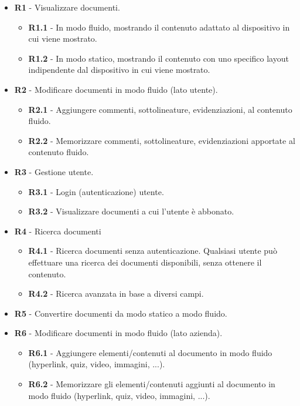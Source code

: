 \begin{itemize}
    \item \textbf{R1} - Visualizzare documenti.
    \begin{itemize}
        \item \textbf{R1.1} - In modo fluido, mostrando il contenuto adattato al dispositivo in cui viene mostrato.
        \item \textbf{R1.2} - In modo statico, mostrando il contenuto con uno specifico layout indipendente dal dispositivo in cui viene mostrato.
    \end{itemize}
    \item \textbf{R2} - Modificare documenti in modo fluido (lato utente).
    \begin{itemize}
        \item \textbf{R2.1} - Aggiungere commenti, sottolineature, evidenziazioni, al contenuto fluido.
        \item \textbf{R2.2} - Memorizzare commenti, sottolineature, evidenziazioni apportate al contenuto fluido.
    \end{itemize}
    \item \textbf{R3} - Gestione utente.
    \begin{itemize}
        \item \textbf{R3.1} - Login (autenticazione) utente.
        \item \textbf{R3.2} - Visualizzare documenti a cui l'utente è abbonato.
    \end{itemize}
    \item \textbf{R4} - Ricerca documenti
    \begin{itemize}
        \item \textbf{R4.1} - Ricerca documenti senza autenticazione. Qualsiasi utente può effettuare una ricerca dei documenti disponibili, senza ottenere il contenuto.
        \item \textbf{R4.2} - Ricerca avanzata in base a diversi campi.
    \end{itemize}
    \item \textbf{R5} - Convertire documenti da modo statico a modo fluido.
    \item \textbf{R6} - Modificare documenti in modo fluido (lato azienda).
    \begin{itemize}
        \item \textbf{R6.1} - Aggiungere elementi/contenuti al documento in modo fluido (hyperlink, quiz, video, immagini, ...).
        \item \textbf{R6.2} - Memorizzare gli elementi/contenuti aggiunti al documento in modo fluido (hyperlink, quiz, video, immagini, ...).
    \end{itemize}
\end{itemize}

